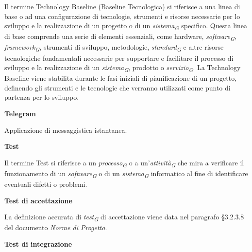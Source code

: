 \documentclass{article}
\begin{document}
Il termine Technology Baseline (Baseline Tecnologica) si riferisce a una linea di base o ad una configurazione di tecnologie, strumenti e risorse necessarie per lo sviluppo e la realizzazione di un progetto o di un \textit{sistema}\textsubscript{\textit{G}} specifico. Questa linea di base comprende una serie di elementi essenziali, come hardware, \textit{software}\textsubscript{\textit{G}}, \textit{framework}\textsubscript{\textit{G}}, strumenti di sviluppo, metodologie, \textit{standard}\textsubscript{\textit{G}} e altre risorse tecnologiche fondamentali necessarie per supportare e facilitare il processo di sviluppo e la realizzazione di un \textit{sistema}\textsubscript{\textit{G}}, prodotto o \textit{servizio}\textsubscript{\textit{G}}. La Technology Baseline viene stabilita durante le fasi iniziali di pianificazione di un progetto, definendo gli strumenti e le tecnologie che verranno utilizzati come punto di partenza per lo sviluppo.

\vspace{0.4cm}

\textbf{Telegram}

\vspace{0.1cm}

Applicazione di messaggistica istantanea.

\vspace{0.4cm}

\textbf{Test}

\vspace{0.1cm}

Il termine Test si riferisce a un \textit{processo}\textsubscript{\textit{G}} o a un'\textit{attività}\textsubscript{\textit{G}} che mira a verificare il funzionamento di un \textit{software}\textsubscript{\textit{G}} o di un \textit{sistema}\textsubscript{\textit{G}} informatico al fine di identificare eventuali difetti o problemi.

\vspace{0.4cm}

\textbf{Test di accettazione}

\vspace{0.1cm}

La definizione accurata di \textit{test}\textsubscript{\textit{G}} di accettazione viene data nel paragrafo §3.2.3.8 del documento \textit{Norme di Progetto}.

\vspace{0.4cm}

\textbf{Test di integrazione}

\vspace{0.1cm}
\end{document}
